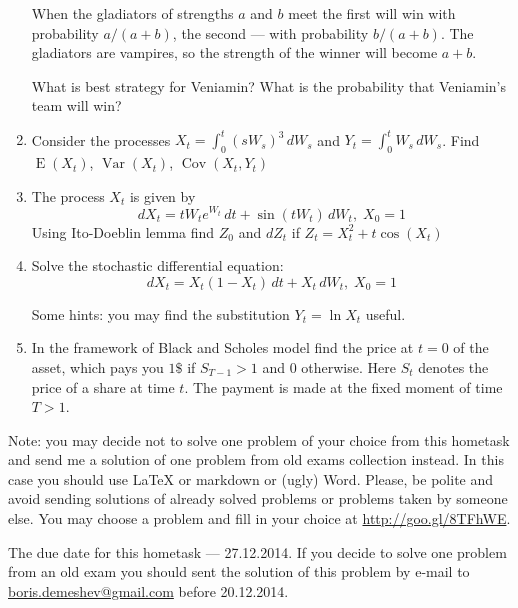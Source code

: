 \documentclass[12pt,a4paper]{article}
\DeclareMathOperator{\Cov}{Cov}
\DeclareMathOperator{\Var}{Var}
\DeclareMathOperator{\E}{E}
\begin{document}
\begin{enumerate}
When the gladiators of strengths $a$ and $b$ meet the first will win with probability $a/(a+b)$, the second --- with probability $b/(a+b)$. The gladiators are vampires, so the strength of the winner will become $a+b$.

What is best strategy for Veniamin? What is the probability that Veniamin's team will win?

\item Consider the processes $X_t=\int_0^t (s W_s)^3 \,dW_s$ and $Y_t=\int_0^t W_s \, dW_s$. Find $\E(X_t)$, $\Var(X_t)$, $\Cov(X_t,Y_t)$

\item The process $X_t$ is given by
\[
dX_t=tW_t e^{W_t} \, dt + \sin (tW_t) \, dW_t, \; X_0=1
\]
Using Ito-Doeblin lemma find $Z_0$ and $dZ_t$ if $Z_t=X_t^2+t\cos (X_t)$

\item Solve the stochastic differential equation:
\[
dX_t=X_t(1-X_t) \, dt+X_t \, dW_t, \; X_0=1
\]

Some hints: you may find the substitution $Y_t = \ln X_t$ useful.

\item In the framework of Black and Scholes model find the price at $t=0$ of the asset, which pays you $1 \$ $  if $S_{T-1}>1$ and $0$ otherwise. Here $S_t$ denotes the price of a share at time $t$. The payment is made at the fixed moment of time $T >1$.

\end{enumerate}

Note: you may decide not to solve one problem of your choice from this hometask and send me a solution of one problem from old exams collection instead. In this case you should use \LaTeX{} or markdown or (ugly) Word. Please, be polite and avoid sending solutions of already solved problems or problems taken by someone else. You may choose a problem and fill in your choice at \url{http://goo.gl/8TFhWE}. 

The due date for this hometask --- 27.12.2014. If you decide to solve one problem from an old exam you should sent the solution of this problem by e-mail to \href{mailto:boris.demeshev@gmail.com}{boris.demeshev@gmail.com} before 20.12.2014. 
\end{document}
